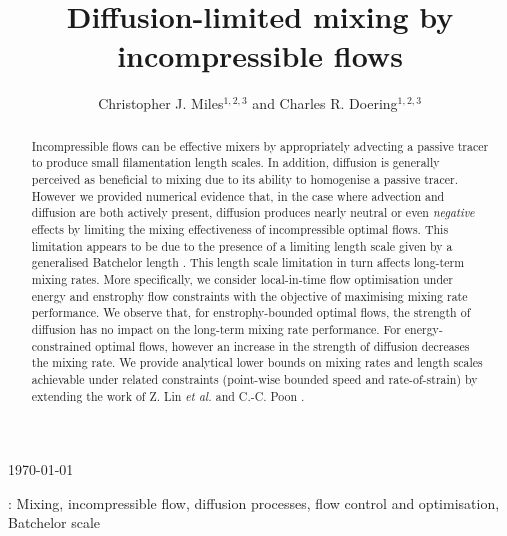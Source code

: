 \documentclass[12pt]{iopart}
\begin{document}
\title[Diffusion-limited mixing by incompressible flows]{Diffusion-limited mixing by incompressible flows}

\author{Christopher J. Miles$^{1,2,3}$ and Charles R. Doering$^{1,2,3}$ }

\address{$^1$ Department of Physics, University of Michigan,
Ann Arbor, MI 48104-1040, USA}
\address{$^2$ Department of Mathematics, University of Michigan,
Ann Arbor, MI 48104-1043, USA}
\address{$^3$ Center for the Study of Complex Systems, University of Michigan,
Ann Arbor, MI 48104-1107, USA}
\vspace{10pt}
\begin{indented}
\item[]\today
\end{indented}

\begin{abstract}
Incompressible flows can be effective mixers by appropriately advecting a passive tracer to produce small filamentation length scales. In addition, diffusion is generally perceived as beneficial to mixing due to its ability to homogenise a passive tracer. However we provided numerical evidence that, in the case where advection and diffusion are both actively present, diffusion produces nearly neutral or even {\it negative} effects by limiting the mixing effectiveness of incompressible optimal flows. This limitation appears to be due to the presence of a limiting length scale given by a generalised Batchelor length \cite{Batchelor1959a}. This length scale limitation in turn affects long-term mixing rates. More specifically, we consider local-in-time flow optimisation under energy and enstrophy flow constraints with the objective of maximising mixing rate performance. We observe that, for enstrophy-bounded optimal flows, the strength of diffusion has no impact on the long-term mixing rate performance. For energy-constrained optimal flows, however an increase in the strength of diffusion decreases the mixing rate. We provide analytical lower bounds on mixing rates and length scales achievable under related constraints (point-wise bounded speed and rate-of-strain) by extending the work of Z. Lin {\it et al.} \cite{JFM2011} and C.-C. Poon \cite{Chi-Cheu1996}. 
\end{abstract}
%
%
\vspace{2pc}
: Mixing, incompressible flow, diffusion processes, flow control and optimisation, Batchelor scale
\end{document}
